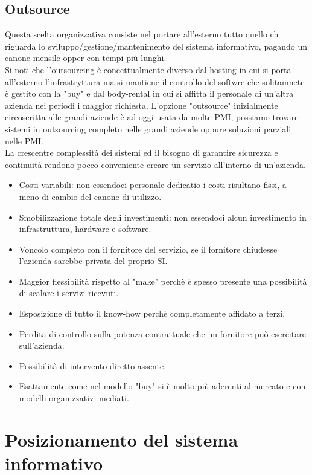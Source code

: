 \documentclass[../main.tex]{subfiles}
\begin{document}
	\subsection{Outsource}
	Questa scelta organizzativa consiste nel portare all'esterno tutto quello ch riguarda lo sviluppo/gestione/mantenimento del sistema informativo, pagando un canone mensile opper con tempi più lunghi.\\
	Si noti che l'outsourcing è concettualmente diverso dal hosting in cui si porta all'esterno l'infrastryttura ma si mantiene il controllo del softwre che solitamnete è gestito con la "buy" e dal body-rental in cui si affitta il personale di un'altra azienda nei periodi i maggior richiesta.
	L'opzione "outsource" inizialmente circoscritta alle grandi aziende è ad oggi usata da molte PMI, possiamo trovare sistemi in outsourcing completo nelle grandi aziende oppure soluzioni parziali nelle PMI.\\
	La crescentre complessità dei sistemi ed il bisogno di garantire sicurezza e continuità rendono pocco conveniente creare un servizio all'interno di un'azienda.
	\begin{itemize}
		\item Costi variabili: non essendoci personale dedicatio i costi risultano fissi, a meno di cambio del canone di utilizzo.
		\item Smobilizzazione totale degli investimenti: non essendoci alcun investimento in infrastruttura, hardware e software.
		\item Voncolo completo con il fornitore del servizio, se il fornitore chiudesse l'azienda sarebbe privata del proprio SI.
		\item Maggior flessibilità rispetto al "make" perchè è spesso presente una possibilità di scalare i servizi ricevuti.
		\item Esposizione di tutto il know-how perchè completamente affidato a terzi.
		\item Perdita di controllo sulla potenza contrattuale che un fornitore può esercitare sull'azienda.
		\item Possibilità di intervento diretto assente.
		\item Esattamente come nel modello "buy" si è molto più aderenti al mercato e con modelli organizzativi mediati.
	\end{itemize}

	\section{Posizionamento del sistema informativo}
\end{document}
